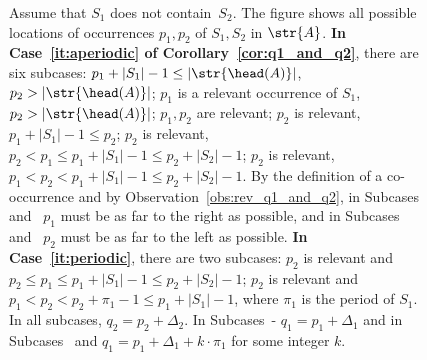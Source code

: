 \begin{figure}[!ht]
\caption{Assume that $S_1$ does not contain~$S_2$. The figure shows all possible locations of occurrences $p_1, p_2$ of $S_1,S_2$ in $\str{A}$. \textbf{In Case~\ref{it:aperiodic} of Corollary~\ref{cor:q1_and_q2}}, there are six subcases:  $p_1+|S_1|-1 \le |\str{\head(A)}|$, $p_2 > |\str{\head(A)}|$;  $p_1$ is a relevant occurrence of $S_1$, $p_2 > |\str{\head(A)}|$;  $p_1,p_2$ are relevant;  $p_2$ is relevant, $p_1+|S_1|-1 \le p_2$;  $p_2$ is relevant, $p_2 < p_1 \le p_1+|S_1|-1 \le p_2 + |S_2|-1$;  $p_2$ is relevant, $p_1 < p_2 < p_1+|S_1|-1 \le p_2+|S_2|-1$. By the definition of a co-occurrence and by Observation~\ref{obs:rev_q1_and_q2}, in Subcases~ and~ $p_1$ must be as far to the right as possible, and in Subcases~ and~ $p_2$ must be as far to the left as possible. \textbf{In Case~\ref{it:periodic}}, there are two subcases:  $p_2$ is relevant and $p_2 \le p_1 \le p_1+|S_1|-1 \le p_2+|S_2|-1$;  $p_2$ is relevant and $p_1 < p_2 < p_2+\pi_1-1 \le p_1+|S_1|-1$, where $\pi_1$ is the period of $S_1$. In all subcases, $q_2=p_2+\Delta_2$. In Subcases~- $q_1=p_1+\Delta_1$ and in Subcases~ and  $q_1=p_1+\Delta_1+k\cdot \pi_1$ for some integer $k$.}
\label{fig:q1_and_q2}
\end{figure}